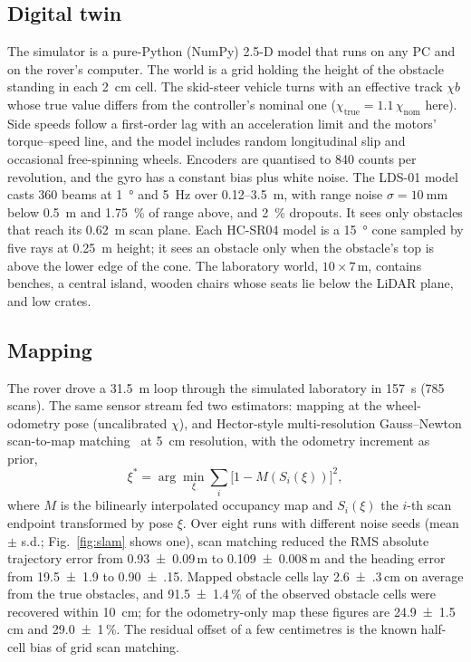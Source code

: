 \documentclass[conference]{IEEEtran}
\newcommand{\slamATEsd}{\num{0.109(8)}}
\newcommand{\odoATEsd}{\num{0.93(9)}}
\newcommand{\slamHead}{\num{0.90(15)}}
\newcommand{\odoHead}{\num{19.5(19)}}
\newcommand{\slamMapAcc}{\num{2.6(3)}}
\newcommand{\odoMapAcc}{\num{24.9(15)}}
\newcommand{\slamCompl}{\num{91.5(14)}}
\newcommand{\odoCompl}{\num{29.0(10)}}
\begin{document}
\subsection{Digital twin}
The simulator is a pure-Python (NumPy) 2.5-D model that runs on any PC and on the rover's computer. The world is a grid holding the height of the obstacle standing in each \SI{2}{\centi\metre} cell. The skid-steer vehicle turns with an effective track $\chi b$ whose true value differs from the controller's nominal one ($\chi_\text{true} = 1.1\,\chi_\text{nom}$ here). Side speeds follow a first-order lag with an acceleration limit and the motors' torque--speed line, and the model includes random longitudinal slip and occasional free-spinning wheels. Encoders are quantised to \num{840} counts per revolution, and the gyro has a constant bias plus white noise. The LDS-01 model casts 360 beams at \SI{1}{\degree} and \SI{5}{\hertz} over \SI{0.12}{}--\SI{3.5}{\metre}, with range noise $\sigma = \SI{10}{\milli\metre}$ below \SI{0.5}{\metre} and \SI{1.75}{\percent} of range above, and \SI{2}{\percent} dropouts. It sees only obstacles that reach its \SI{0.62}{\metre} scan plane. Each HC-SR04 model is a \SI{15}{\degree} cone sampled by five rays at \SI{0.25}{\metre} height; it sees an obstacle only when the obstacle's top is above the lower edge of the cone. The laboratory world, $10\times7$\,m, contains benches, a central island, wooden chairs whose seats lie below the LiDAR plane, and low crates.

\subsection{Mapping}
The rover drove a \SI{31.5}{\metre} loop through the simulated laboratory in \SI{157}{\second} (785 scans). The same sensor stream fed two estimators: mapping at the wheel-odometry pose (uncalibrated $\chi$), and Hector-style multi-resolution Gauss--Newton scan-to-map matching~\cite{kohlbrecher2011} at \SI{5}{\centi\metre} resolution, with the odometry increment as prior,
\begin{equation}
\xi^\ast = \arg\min_{\xi}\sum_i \big[1 - M(S_i(\xi))\big]^2,
\end{equation}
where $M$ is the bilinearly interpolated occupancy map and $S_i(\xi)$ the $i$-th scan endpoint transformed by pose $\xi$. Over eight runs with different noise seeds (mean $\pm$ s.d.; Fig.~\ref{fig:slam} shows one), scan matching reduced the RMS absolute trajectory error from \odoATEsd\,m to \slamATEsd\,m and the heading error from \odoHead\textdegree{} to \slamHead\textdegree. Mapped obstacle cells lay \slamMapAcc\,cm on average from the true obstacles, and \slamCompl\,\% of the observed obstacle cells were recovered within \SI{10}{\centi\metre}; for the odometry-only map these figures are \odoMapAcc\,cm and \odoCompl\,\%. The residual offset of a few centimetres is the known half-cell bias of grid scan matching.
\end{document}
